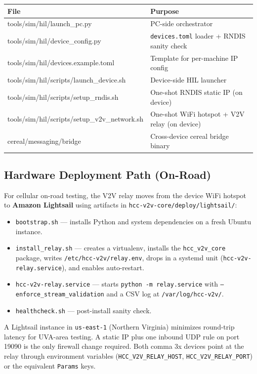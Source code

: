\documentclass[12pt]{article}
\begin{document}
\begin{center}
\begin{tabular}{>{\ttfamily}p{7.5cm} p{5cm}}
  \toprule
  File & Purpose \\
  \midrule
  tools/sim/hil/launch\_pc.py          & PC-side orchestrator \\
  tools/sim/hil/device\_config.py      & \texttt{devices.toml} loader + RNDIS sanity check \\
  tools/sim/hil/devices.example.toml  & Template for per-machine IP config \\
  tools/sim/hil/scripts/launch\_device.sh    & Device-side HIL launcher \\
  tools/sim/hil/scripts/setup\_rndis.sh      & One-shot RNDIS static IP (on device) \\
  tools/sim/hil/scripts/setup\_v2v\_network.sh & One-shot WiFi hotspot + V2V relay (on device) \\
  cereal/messaging/bridge             & Cross-device cereal bridge binary \\
  \bottomrule
\end{tabular}
\end{center}

\subsection{Hardware Deployment Path (On-Road)}

For cellular on-road testing, the V2V relay moves from the device WiFi hotspot to \textbf{Amazon Lightsail} using artifacts in \texttt{hcc-v2v-core/deploy/lightsail/}:

\begin{itemize}
  \item \texttt{bootstrap.sh} --- installs Python and system dependencies on a fresh Ubuntu instance.
  \item \texttt{install\_relay.sh} --- creates a virtualenv, installs the \texttt{hcc\_v2v\_core} package, writes \texttt{/etc/hcc-v2v/relay.env}, drops in a systemd unit (\texttt{hcc-v2v-relay.service}), and enables auto-restart.
  \item \texttt{hcc-v2v-relay.service} --- starts \texttt{python -m relay.service} with \texttt{--enforce\_stream\_validation} and a CSV log at \texttt{/var/log/hcc-v2v/}.
  \item \texttt{healthcheck.sh} --- post-install sanity check.
\end{itemize}

A Lightsail instance in \texttt{us-east-1} (Northern Virginia) minimizes round-trip latency for UVA-area testing. A static IP plus one inbound UDP rule on port 19090 is the only firewall change required. Both comma 3x devices point at the relay through environment variables (\texttt{HCC\_V2V\_RELAY\_HOST}, \texttt{HCC\_V2V\_RELAY\_PORT}) or the equivalent \texttt{Params} keys.
\end{document}
